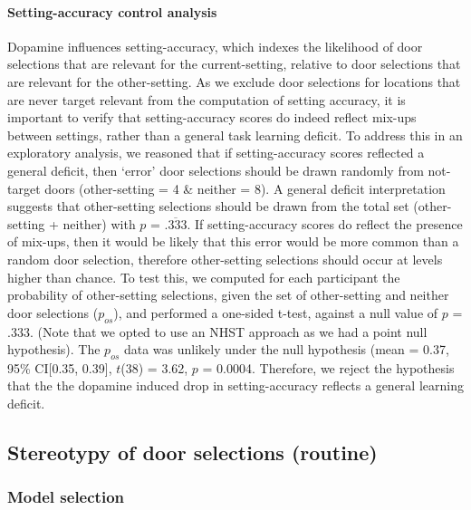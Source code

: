 \documentclass{article}
\begin{document}
\hypertarget{setting-accuracy-control-analysis}{%
\paragraph{Setting-accuracy control
analysis}\label{setting-accuracy-control-analysis}}

Dopamine influences setting-accuracy, which indexes the likelihood of
door selections that are relevant for the current-setting, relative to
door selections that are relevant for the other-setting. As we exclude
door selections for locations that are never target relevant from the
computation of setting accuracy, it is important to verify that
setting-accuracy scores do indeed reflect mix-ups between settings,
rather than a general task learning deficit. To address this in an
exploratory analysis, we reasoned that if setting-accuracy scores
reflected a general deficit, then `error' door selections should be
drawn randomly from not-target doors (other-setting = 4 \& neither = 8).
A general deficit interpretation suggests that other-setting selections
should be drawn from the total set (other-setting + neither) with \(p\)
= \(\overline{.333}\). If setting-accuracy scores do reflect the
presence of mix-ups, then it would be likely that this error would be
more common than a random door selection, therefore other-setting
selections should occur at levels higher than chance. To test this, we
computed for each participant the probability of other-setting
selections, given the set of other-setting and neither door selections
(\(p_{os}\)), and performed a one-sided t-test, against a null value of
\(p\) = .333. (Note that we opted to use an NHST approach as we had a
point null hypothesis). The \(p_{os}\) data was unlikely under the null
hypothesis (mean = 0.37, 95\% CI{[}0.35, 0.39{]}, \(t\)(38) = 3.62,
\(p\) = 0.0004. Therefore, we reject the hypothesis that the the
dopamine induced drop in setting-accuracy reflects a general learning
deficit.

\hypertarget{stereotypy-of-door-selections-routine}{%
\subsection{Stereotypy of door selections
(routine)}\label{stereotypy-of-door-selections-routine}}

\hypertarget{model-selection-2}{%
\subsubsection{Model selection}\label{model-selection-2}}
\end{document}
